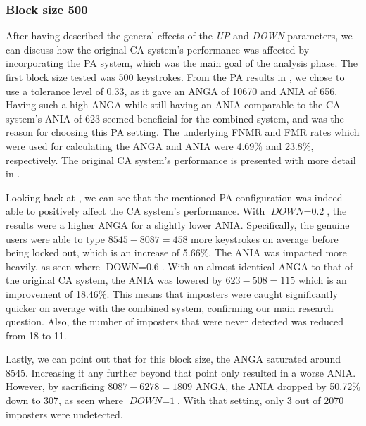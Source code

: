 \subsubsection{Block size 500}
After having described the general effects of the \textit{UP} and \textit{DOWN} parameters, we can discuss how the original CA system's performance was affected by incorporating the PA system, which was the main goal of the analysis phase.
The first block size tested was 500 keystrokes.
From the PA results in , we chose to use a tolerance level of 0.33, as it gave an ANGA of 10670 and ANIA of 656.
Having such a high ANGA while still having an ANIA comparable to the CA system's ANIA of 623 seemed beneficial for the combined system, and was the reason for choosing this PA setting.
The underlying FNMR and FMR rates which were used for calculating the ANGA and ANIA were 4.69\% and 23.8\%, respectively.
The original CA system's performance is presented with more detail in .

Looking back at , we can see that the mentioned PA configuration was indeed able to positively affect the CA system's performance.
With $\textit{DOWN} = \text{0.2}$, the results were a higher ANGA for a slightly lower ANIA.
Specifically, the genuine users were able to type $8545-8087 = 458$ more keystrokes on average before being locked out, which is an increase of 5.66\%.
The ANIA was impacted more heavily, as seen where $\text{DOWN} = \text{0.6}$.
With an almost identical ANGA to that of the original CA system, the ANIA was lowered by $\text{623}-\text{508} = \text{115}$ which is an improvement of 18.46\%.
This means that imposters were caught significantly quicker on average with the combined system, confirming our main research question.
Also, the number of imposters that were never detected was reduced from 18 to 11.

Lastly, we can point out that for this block size, the ANGA saturated around 8545.
Increasing it any further beyond that point only resulted in a worse ANIA.
However, by sacrificing $\text{8087} - \text{6278} = \text{1809}$ ANGA, the ANIA dropped by 50.72\% down to 307, as seen where $\textit{DOWN} = \text{1}$.
With that setting, only 3 out of 2070 imposters were undetected.

